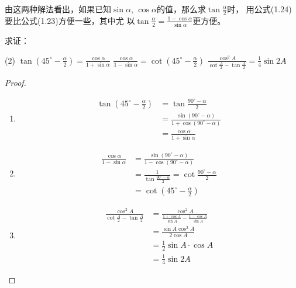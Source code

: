 由这两种解法看出，如果已知$\sin\alpha$, $\cos\alpha$的值，那么求$\tan\frac{\alpha}{2}$时，
用公式(1.24)要比公式(1.23)方便一些，其中尤
以$\tan\frac{\alpha}{2}=\frac{1-\cos\alpha}{\sin\alpha}$更方便。

\begin{example}
    求证：
    \begin{tasks}(2)
    \task $\tan\left(45^{\circ}-\frac{\alpha}{2}\right)=\frac{\cos\alpha}{1+\sin\alpha}$
    \task $\frac{\cos\alpha}{1-\sin\alpha}=\cot \left(45^{\circ}-\frac{\alpha}{2}\right)$
    \task $\frac{\cos^2 A}{\cot\frac{A}{2}-\tan\frac{A}{2}}=\frac{1}{4}\sin 2A$
\end{tasks}
\end{example}

\begin{proof}
\begin{enumerate}
    \item \[\begin{split}
\tan\left(45^{\circ}-\frac{\alpha}{2}\right) &=\tan\frac{90^{\circ}-\alpha}{2}\\ 
&=\frac{\sin(90^{\circ}-\alpha)}{1+\cos(90^{\circ}-\alpha)}\\
&=\frac{\cos\alpha}{1+\sin\alpha}
    \end{split}\]

    \item \[\begin{split}
        \frac{\cos\alpha}{1-\sin\alpha}&= \frac{\sin(90^{\circ}-\alpha)}{1-\cos(90^{\circ}-\alpha)}\\
        &=\frac{1}{\tan\frac{90^{\circ}-\alpha}{2}}=\cot\frac{90^{\circ}-\alpha}{2}\\
&=\cot\left(45^{\circ}-\frac{\alpha}{2}\right)
    \end{split}\]

    \item \[\begin{split}
\frac{\cos^2 A}{\cot\frac{A}{2}-\tan\frac{A}{2}}&=\frac{\cos^2 A}{\frac{1+\cos A}{\sin A}-\frac{1-\cos A}{\sin A}}\\        
&=\frac{\sin A\cos^2 A}{2\cos A}\\
&=\frac{1}{2}\sin A\cdot \cos A\\
&=\frac{1}{4}\sin 2A
    \end{split}\]
\end{enumerate}    
\end{proof}

